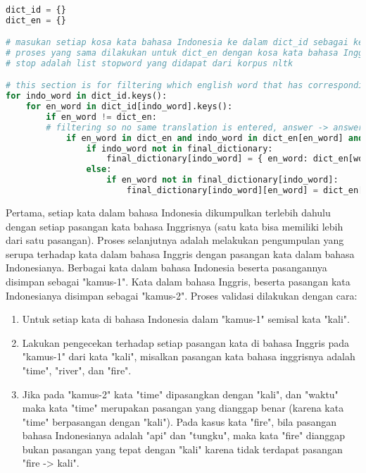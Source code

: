 \begin{lstlisting}[language=Python, caption={Word Alignment Enhancement}, label={word-alignment-enhancement}]

dict_id = {}
dict_en = {}

# masukan setiap kosa kata bahasa Indonesia ke dalam dict_id sebagai key dan kumpulan pasangan kata bahasa inggrisnya sebagai value
# proses yang sama dilakukan untuk dict_en dengan kosa kata bahasa Inggris sebagai key dan kumpulan pasangan kata bahasa Indonesia sebagai value
# stop adalah list stopword yang didapat dari korpus nltk

# this section is for filtering which english word that has corresponding indo translation (bidirectional) from Giza output
for indo_word in dict_id.keys():
	for en_word in dict_id[indo_word].keys():
		if en_word != dict_en:
		# filtering so no same translation is entered, answer -> answer, jawaban -> jawaban
			if en_word in dict_en and indo_word in dict_en[en_word] and en_word not in stop:
				if indo_word not in final_dictionary:
					final_dictionary[indo_word] = { en_word: dict_en[word_en][word_id] }
				else:
					if en_word not in final_dictionary[indo_word]:
						final_dictionary[indo_word][en_word] = dict_en[word_en][word_id]
\end{lstlisting}

Pertama, setiap kata dalam bahasa Indonesia dikumpulkan terlebih dahulu dengan setiap pasangan kata bahasa Inggrisnya (satu kata bisa memiliki lebih dari satu pasangan). Proses selanjutnya adalah melakukan pengumpulan yang serupa terhadap kata dalam bahasa Inggris dengan pasangan kata dalam bahasa Indonesianya. Berbagai kata dalam bahasa Indonesia beserta pasangannya disimpan sebagai "kamus-1". Kata dalam bahasa Inggris, beserta pasangan kata Indonesianya disimpan sebagai "kamus-2". Proses validasi dilakukan dengan cara:

\begin{enumerate}
	\item Untuk setiap kata di bahasa Indonesia dalam "kamus-1" semisal kata "kali".
	\item Lakukan pengecekan terhadap setiap pasangan kata di bahasa Inggris pada "kamus-1" dari kata "kali", misalkan pasangan kata bahasa inggrisnya adalah "time", "river", dan "fire".
	\item Jika pada "kamus-2" kata "time" dipasangkan dengan "kali", dan "waktu" maka kata "time" merupakan pasangan yang dianggap benar (karena kata "time" berpasangan dengan "kali"). Pada kasus kata "fire", bila pasangan bahasa Indonesianya adalah "api" dan "tungku", maka kata "fire" dianggap bukan pasangan yang tepat dengan "kali" karena tidak terdapat pasangan "fire -> kali".
\end{enumerate} 


